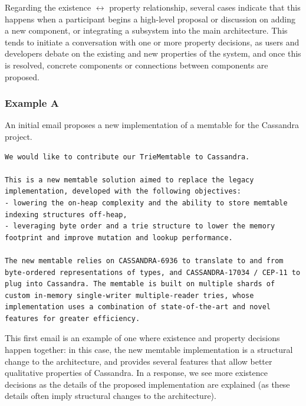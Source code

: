 \documentclass[a4paper, 12pt]{article}
\begin{document}
		Regarding the existence $ \leftrightarrow $ property relationship, several cases indicate that this happens when a participant begins a high-level proposal or discussion on adding a new component, or integrating a subsystem into the main architecture. This tends to initiate a conversation with one or more property decisions, as users and developers debate on the existing and new properties of the system, and once this is resolved, concrete components or connections between components are proposed.
		
		\subsubsection{Example A}
			An initial email proposes a new implementation of a memtable for the Cassandra project.
			
			\begin{verbatim}
We would like to contribute our TrieMemtable to Cassandra.

This is a new memtable solution aimed to replace the legacy implementation, developed with the following objectives:
- lowering the on-heap complexity and the ability to store memtable indexing structures off-heap,
- leveraging byte order and a trie structure to lower the memory footprint and improve mutation and lookup performance.

The new memtable relies on CASSANDRA-6936 to translate to and from byte-ordered representations of types, and CASSANDRA-17034 / CEP-11 to plug into Cassandra. The memtable is built on multiple shards of custom in-memory single-writer multiple-reader tries, whose implementation uses a combination of state-of-the-art and novel features for greater efficiency.
			\end{verbatim}
		
			This first email is an example of one where existence and property decisions happen together: in this case, the new memtable implementation is a structural change to the architecture, and provides several features that allow better qualitative properties of Cassandra. In a response, we see more existence decisions as the details of the proposed implementation are explained (as these details often imply structural changes to the architecture).
			
\end{document}
